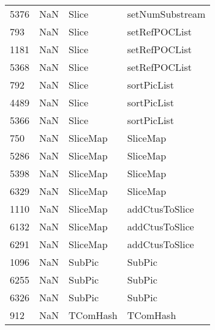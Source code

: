\begin{tabular}{llll}
5376 &                   NaN &                      Slice &                           setNumSubstream \\
793  &                   NaN &                      Slice &                             setRefPOCList \\
1181 &                   NaN &                      Slice &                             setRefPOCList \\
5368 &                   NaN &                      Slice &                             setRefPOCList \\
792  &                   NaN &                      Slice &                               sortPicList \\
4489 &                   NaN &                      Slice &                               sortPicList \\
5366 &                   NaN &                      Slice &                               sortPicList \\
750  &                   NaN &                   SliceMap &                                  SliceMap \\
5286 &                   NaN &                   SliceMap &                                  SliceMap \\
5398 &                   NaN &                   SliceMap &                                  SliceMap \\
6329 &                   NaN &                   SliceMap &                                  SliceMap \\
1110 &                   NaN &                   SliceMap &                            addCtusToSlice \\
6132 &                   NaN &                   SliceMap &                            addCtusToSlice \\
6291 &                   NaN &                   SliceMap &                            addCtusToSlice \\
1096 &                   NaN &                     SubPic &                                    SubPic \\
6255 &                   NaN &                     SubPic &                                    SubPic \\
6326 &                   NaN &                     SubPic &                                    SubPic \\
912  &                   NaN &                   TComHash &                                  TComHash \\

\end{tabular}
